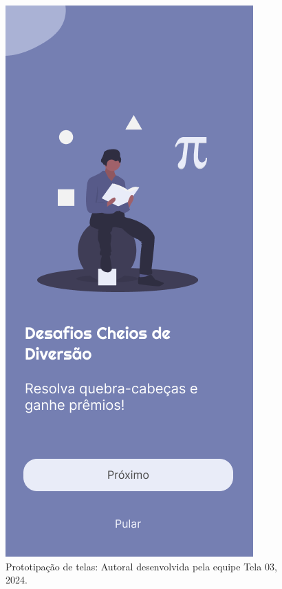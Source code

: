 \documentclass[12pt, openany, oneside, a4paper, english, brazil]{abntex2}   %
\begin{document}
\begin{figure}
    \centering
    \includegraphics[scale=0.7]{figuras/Math.Pow App/challenges.png}
    \caption{Prototipação de telas: Autoral desenvolvida pela equipe Tela 03, 2024.}
    \label{fig:nome-da-imagem}
\end{figure}
\end{document}
